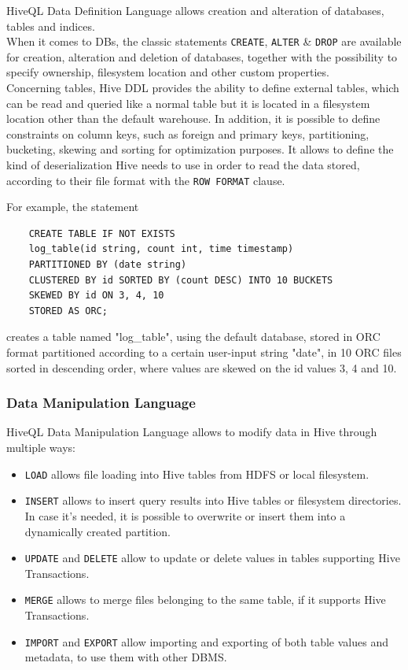 HiveQL Data Definition Language allows creation and alteration of databases, tables and indices.\\When it comes to DBs, the classic statements \texttt{CREATE}, \texttt{ALTER} \& \texttt{DROP} are available for creation, alteration and deletion of databases, together with the possibility to specify ownership, filesystem location and other custom properties.\\
Concerning tables, Hive DDL provides the ability to define external tables, which can be read and queried like a normal table but it is located in a filesystem location other than the default warehouse. In addition, it is possible to define constraints on column keys, such as foreign and primary keys, partitioning, bucketing, skewing and sorting for optimization purposes. It allows to define the kind of deserialization Hive needs to use in order to read the data stored, according to their file format with the \texttt{ROW FORMAT} clause.

For example, the statement

\begin{verbatim}
    CREATE TABLE IF NOT EXISTS 
    log_table(id string, count int, time timestamp)
    PARTITIONED BY (date string)
    CLUSTERED BY id SORTED BY (count DESC) INTO 10 BUCKETS
    SKEWED BY id ON 3, 4, 10
    STORED AS ORC;
\end{verbatim}

creates a table named "log\_table", using the default database, stored in ORC format partitioned according to a certain user-input string "date", in 10 ORC files sorted in descending order, where values are skewed on the id values 3, 4 and 10.

\subsubsection{Data Manipulation Language}

HiveQL Data Manipulation Language allows to modify data in Hive through multiple ways:

\begin{itemize}
    \item \texttt{LOAD} allows file loading into Hive tables from HDFS or local filesystem.  
    \item \texttt{INSERT} allows to insert query results into Hive tables or filesystem directories. In case it's needed, it is possible to overwrite or insert them into a dynamically created partition. 
    \item \texttt{UPDATE} and \texttt{DELETE} allow to update or delete values in tables supporting Hive Transactions.
    \item \texttt{MERGE} allows to merge files belonging to the same table, if it supports Hive Transactions.
    \item \texttt{IMPORT} and \texttt{EXPORT} allow importing and exporting of both table values and metadata, to use them with other DBMS.
\end{itemize}

